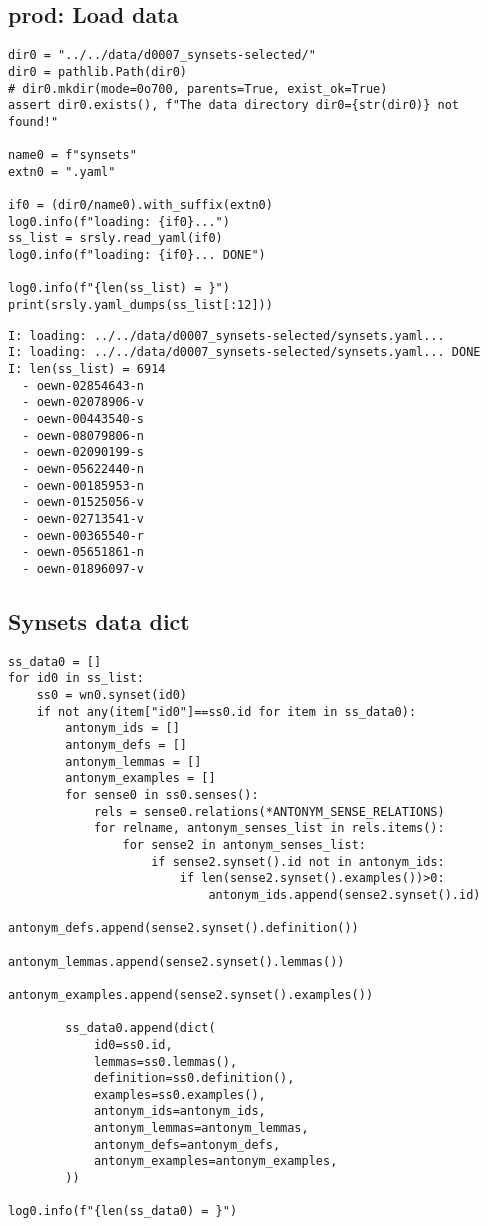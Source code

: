 \documentclass[a4paper,10pt,onecolumn,oneside,openright]{article}
\begin{document}
\subsection{prod: Load data}
\label{sec:orgc97bdeb}
\begin{verbatim}
dir0 = "../../data/d0007_synsets-selected/"
dir0 = pathlib.Path(dir0)
# dir0.mkdir(mode=0o700, parents=True, exist_ok=True)
assert dir0.exists(), f"The data directory dir0={str(dir0)} not found!"

name0 = f"synsets"
extn0 = ".yaml"

if0 = (dir0/name0).with_suffix(extn0)
log0.info(f"loading: {if0}...")
ss_list = srsly.read_yaml(if0)
log0.info(f"loading: {if0}... DONE")

log0.info(f"{len(ss_list) = }")
print(srsly.yaml_dumps(ss_list[:12]))
\end{verbatim}

\begin{verbatim}
I: loading: ../../data/d0007_synsets-selected/synsets.yaml...
I: loading: ../../data/d0007_synsets-selected/synsets.yaml... DONE
I: len(ss_list) = 6914
  - oewn-02854643-n
  - oewn-02078906-v
  - oewn-00443540-s
  - oewn-08079806-n
  - oewn-02090199-s
  - oewn-05622440-n
  - oewn-00185953-n
  - oewn-01525056-v
  - oewn-02713541-v
  - oewn-00365540-r
  - oewn-05651861-n
  - oewn-01896097-v
\end{verbatim}
\subsection{Synsets data dict}
\label{sec:org7f99869}
\begin{verbatim}
ss_data0 = []
for id0 in ss_list:
    ss0 = wn0.synset(id0)
    if not any(item["id0"]==ss0.id for item in ss_data0):
        antonym_ids = []
        antonym_defs = []
        antonym_lemmas = []
        antonym_examples = []
        for sense0 in ss0.senses():
            rels = sense0.relations(*ANTONYM_SENSE_RELATIONS)
            for relname, antonym_senses_list in rels.items():
                for sense2 in antonym_senses_list:
                    if sense2.synset().id not in antonym_ids:
                        if len(sense2.synset().examples())>0:
                            antonym_ids.append(sense2.synset().id)
                            antonym_defs.append(sense2.synset().definition())
                            antonym_lemmas.append(sense2.synset().lemmas())
                            antonym_examples.append(sense2.synset().examples())

        ss_data0.append(dict(
            id0=ss0.id,
            lemmas=ss0.lemmas(),
            definition=ss0.definition(),
            examples=ss0.examples(),
            antonym_ids=antonym_ids,
            antonym_lemmas=antonym_lemmas,
            antonym_defs=antonym_defs,
            antonym_examples=antonym_examples,
        ))

log0.info(f"{len(ss_data0) = }")
\end{verbatim}
\end{document}
